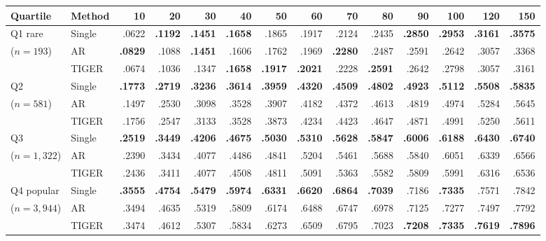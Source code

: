 \documentclass[preprint,12pt]{elsarticle}
\begin{document}
\begin{table}[htbp]
\centering
\small
\setlength{\tabcolsep}{1.45pt}
\begin{adjustbox}{max width=\linewidth}
\begin{tabular}{llrrrrrrrrrrrr}
\toprule
Quartile & Method & 10 & 20 & 30 & 40 & 50 & 60 & 70 & 80 & 90 & 100 & 120 & 150 \\
\midrule
Q1 rare & Single & .0622 & \textbf{.1192} & \textbf{.1451} & \textbf{.1658} & .1865 & .1917 & .2124 & .2435 & \textbf{.2850} & \textbf{.2953} & \textbf{.3161} & \textbf{.3575} \\
($n=193$) & AR & \textbf{.0829} & .1088 & \textbf{.1451} & .1606 & .1762 & .1969 & \textbf{.2280} & .2487 & .2591 & .2642 & .3057 & .3368 \\
& TIGER & .0674 & .1036 & .1347 & \textbf{.1658} & \textbf{.1917} & \textbf{.2021} & .2228 & \textbf{.2591} & .2642 & .2798 & .3057 & .3161 \\
\midrule
Q2 & Single & \textbf{.1773} & \textbf{.2719} & \textbf{.3236} & \textbf{.3614} & \textbf{.3959} & \textbf{.4320} & \textbf{.4509} & \textbf{.4802} & \textbf{.4923} & \textbf{.5112} & \textbf{.5508} & \textbf{.5835} \\
($n=581$) & AR & .1497 & .2530 & .3098 & .3528 & .3907 & .4182 & .4372 & .4613 & .4819 & .4974 & .5284 & .5645 \\
& TIGER & .1756 & .2547 & .3133 & .3528 & .3873 & .4234 & .4423 & .4647 & .4871 & .4991 & .5250 & .5611 \\
\midrule
Q3 & Single & \textbf{.2519} & \textbf{.3449} & \textbf{.4206} & \textbf{.4675} & \textbf{.5030} & \textbf{.5310} & \textbf{.5628} & \textbf{.5847} & \textbf{.6006} & \textbf{.6188} & \textbf{.6430} & \textbf{.6740} \\
($n=1{,}322$) & AR & .2390 & .3434 & .4077 & .4486 & .4841 & .5204 & .5461 & .5688 & .5840 & .6051 & .6339 & .6566 \\
& TIGER & .2436 & .3411 & .4077 & .4508 & .4811 & .5091 & .5363 & .5582 & .5809 & .5991 & .6316 & .6536 \\
\midrule
Q4 popular & Single & \textbf{.3555} & \textbf{.4754} & \textbf{.5479} & \textbf{.5974} & \textbf{.6331} & \textbf{.6620} & \textbf{.6864} & \textbf{.7039} & .7186 & \textbf{.7335} & .7571 & .7842 \\
($n=3{,}944$) & AR & .3494 & .4635 & .5319 & .5809 & .6174 & .6488 & .6747 & .6978 & .7125 & .7277 & .7497 & .7792 \\
& TIGER & .3474 & .4612 & .5307 & .5834 & .6273 & .6509 & .6795 & .7023 & \textbf{.7208} & \textbf{.7335} & \textbf{.7619} & \textbf{.7896} \\

\end{tabular}
\end{adjustbox}
\end{table}
\end{document}
